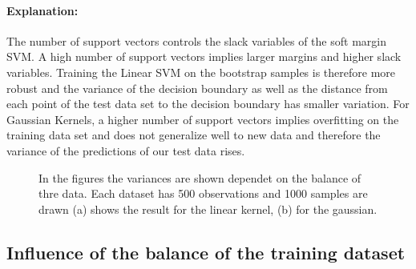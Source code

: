\documentclass[a4paper]{article}
\begin{document}
\paragraph{Explanation:}
The number of support vectors controls the slack variables of the soft margin SVM. A high number of support vectors implies larger margins and higher slack variables. Training the Linear SVM on the bootstrap samples is therefore more robust and the variance of the decision boundary as well as the distance from each point of the test data set to the decision boundary has smaller variation.
For Gaussian Kernels, a higher number of support vectors implies overfitting on the training data set and does not generalize well to new data and therefore the variance of the predictions of our test data rises.

\begin{figure}[!htb]
\begin{center}

\caption{In the figures the variances are shown dependet on the balance of thre data. Each dataset has 500 observations and 1000 samples are drawn (a) shows the result for the linear kernel, (b) for the gaussian.}
\label{fig5}
\end{center}
\end{figure}


\subsection{Influence of the balance of the training dataset}
\end{document}
